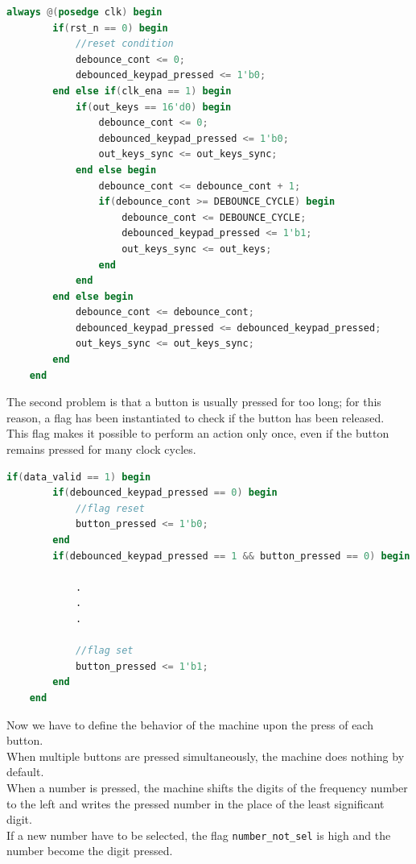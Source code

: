 \vspace{0.5cm}
\begin{lstlisting}[language=Verilog, caption=Debounce circuit, 
label=lst:debounce_circuit ]
    always @(posedge clk) begin
        if(rst_n == 0) begin
            //reset condition
            debounce_cont <= 0;
            debounced_keypad_pressed <= 1'b0;
        end else if(clk_ena == 1) begin
            if(out_keys == 16'd0) begin
                debounce_cont <= 0;
                debounced_keypad_pressed <= 1'b0;
                out_keys_sync <= out_keys_sync;
            end else begin
                debounce_cont <= debounce_cont + 1;
                if(debounce_cont >= DEBOUNCE_CYCLE) begin
                    debounce_cont <= DEBOUNCE_CYCLE;
                    debounced_keypad_pressed <= 1'b1;
                    out_keys_sync <= out_keys;
                end
            end
        end else begin
            debounce_cont <= debounce_cont;
            debounced_keypad_pressed <= debounced_keypad_pressed;
            out_keys_sync <= out_keys_sync;
        end
    end
\end{lstlisting}
\vspace{0.5cm}

\newpage
\noindent
The second problem is that a button is usually pressed for too long; for this reason, a flag has been instantiated to check if the button has been released. \\
This flag makes it possible to perform an action only once, even if the button remains pressed for many clock cycles.

\vspace{0.5cm}
\begin{lstlisting}[language=Verilog, caption=Flag to avoid multiple operation with a single press, 
label=lst:pressed_button_flag ]
    if(data_valid == 1) begin   
        if(debounced_keypad_pressed == 0) begin
            //flag reset
            button_pressed <= 1'b0;
        end
        if(debounced_keypad_pressed == 1 && button_pressed == 0) begin
    
            .
            .
            .
            
            //flag set
            button_pressed <= 1'b1;
        end
    end
\end{lstlisting}
\vspace{1cm}

\noindent
Now we have to define the behavior of the machine upon the press of each button. \\
When multiple buttons are pressed simultaneously, the machine does nothing by default. \\
When a number is pressed, the machine shifts the digits of the frequency number to the left and writes the pressed number in the place of the least significant digit. \\
If a new number have to be selected, the flag \texttt{number\_not\_sel} is high and the number become the digit pressed.

